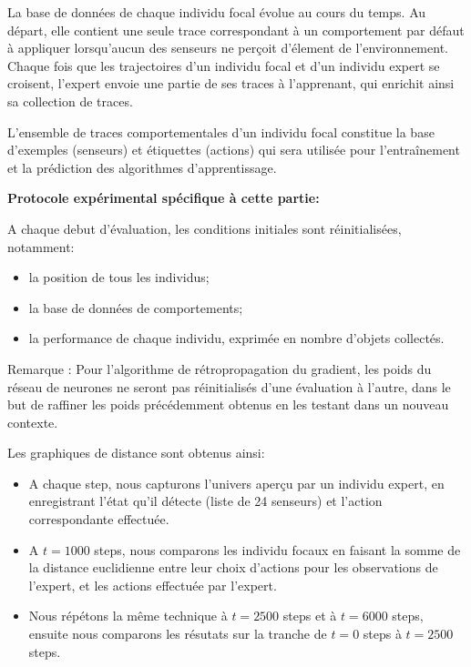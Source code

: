 \documentclass[a4paper, 12pt]{report}
\begin{document}
	La base de données de chaque individu focal évolue au cours du temps. Au départ, elle contient une seule trace correspondant à un comportement par défaut à appliquer lorsqu'aucun des senseurs ne perçoit d'élement de l'environnement. Chaque fois que les trajectoires d'un individu focal et d'un individu expert se croisent, l'expert envoie une partie de ses traces à l'apprenant, qui enrichit ainsi sa collection de traces.
	
    L'ensemble de traces comportementales d'un individu focal constitue la base d'exemples (senseurs) et étiquettes (actions) qui sera utilisée pour l'entraînement et la prédiction des algorithmes d'apprentissage.
    
    \:
    
    \textbf{Protocole expérimental spécifique à cette partie:} 
    
    A chaque debut d'évaluation, les conditions initiales sont réinitialisées, notamment:
    \begin{itemize}
	\item la position de tous les individus;
    \item la base de données de comportements;
    \item la performance de chaque individu, exprimée en nombre d'objets collectés.
	\end{itemize}
    
    Remarque : Pour l'algorithme de rétropropagation du gradient, les poids du réseau de neurones ne seront pas réinitialisés d'une évaluation à l'autre, dans le but de raffiner les poids précédemment obtenus en les testant dans un nouveau contexte.
    
    Les graphiques de distance sont obtenus ainsi:
    \begin{itemize}
        \item A chaque step, nous capturons l'univers aperçu par un individu expert, en enregistrant l'état qu'il détecte (liste de 24 senseurs) et l'action correspondante effectuée.
        \item A $t = 1000$ steps, nous comparons les individu focaux en faisant la somme de la distance euclidienne entre leur choix d'actions pour les observations de l'expert, et les actions effectuée par l'expert.
        \item Nous répétons la même technique à $t = 2500$ steps et à $t = 6000$ steps, ensuite nous comparons les résutats sur la tranche de $t = 0$ steps à $t = 2500$ steps.
    \end{itemize}
\end{document}

